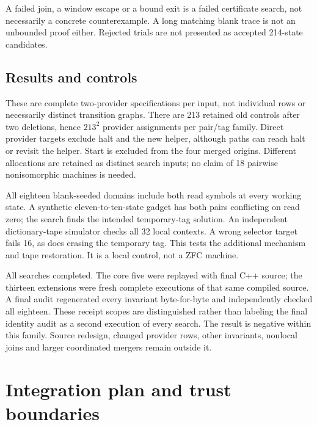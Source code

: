 \documentclass[11pt]{article}
\begin{document}
A failed join, a window escape or a bound exit is a failed certificate search,
not necessarily a concrete counterexample. A long matching blank trace is not
an unbounded proof either. Rejected trials are not presented as accepted
214-state candidates.

\subsection{Results and controls}


These are complete two-provider specifications per input, not individual rows
or necessarily distinct transition graphs. There are 213 retained old controls
after two deletions, hence $213^2$ provider assignments per pair/tag family.
Direct provider targets exclude halt and the new helper, although paths can
reach halt or revisit the helper. Start is excluded from the four merged origins.
Different allocations are retained as distinct search inputs; no claim of 18
pairwise nonisomorphic machines is needed.

All eighteen blank-seeded domains include both read symbols at every working
state. A synthetic eleven-to-ten-state gadget has both pairs conflicting on
read zero; the search finds the intended temporary-tag solution. An independent
dictionary-tape simulator checks all 32 local contexts. A wrong selector target
fails 16, as does erasing the temporary tag. This tests the additional mechanism
and tape restoration. It is a local control, not a ZFC machine.

All searches completed. The core five were replayed with final C++ source; the
thirteen extensions were fresh complete executions of that same compiled
source. A final audit regenerated every invariant byte-for-byte and independently
checked all eighteen. These receipt scopes are distinguished rather than
labeling the final identity audit as a second execution of every search.
The result is negative within this family. Source redesign, changed provider
rows, other invariants, nonlocal joins and larger coordinated mergers remain
outside it.

\section{Integration plan and trust boundaries}
\end{document}

